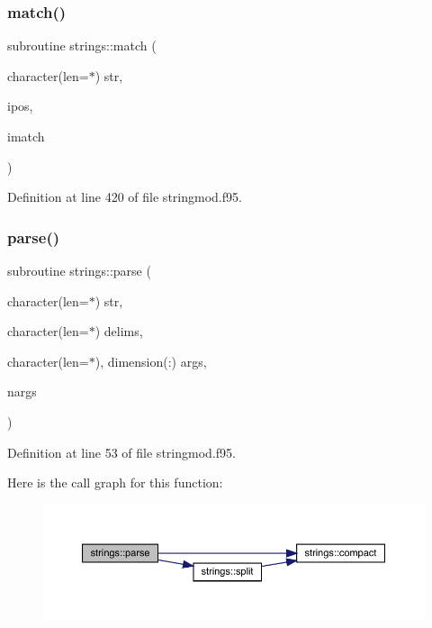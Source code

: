\subsubsection{\texorpdfstring{match()}{match()}}
{\footnotesize\ttfamily subroutine strings\+::match (\begin{DoxyParamCaption}\item[{character(len=$\ast$)}]{str,  }\item[{}]{ipos,  }\item[{}]{imatch }\end{DoxyParamCaption})}



Definition at line 420 of file stringmod.\+f95.

\mbox{\label{namespacestrings_a6905131fa6e36e7e719b2f3c5f499d93}} 
\subsubsection{\texorpdfstring{parse()}{parse()}}
{\footnotesize\ttfamily subroutine strings\+::parse (\begin{DoxyParamCaption}\item[{character(len=$\ast$)}]{str,  }\item[{character(len=$\ast$)}]{delims,  }\item[{character(len=$\ast$), dimension(\+:)}]{args,  }\item[{}]{nargs }\end{DoxyParamCaption})}



Definition at line 53 of file stringmod.\+f95.

Here is the call graph for this function\+:\nopagebreak
\begin{figure}[H]
\begin{center}
\leavevmode
\includegraphics[width=350pt]{namespacestrings_a6905131fa6e36e7e719b2f3c5f499d93_cgraph}
\end{center}
\end{figure}
\mbox{\label{namespacestrings_a6c26fe0ca9e11a3ca296f1c350f54f42}} 
